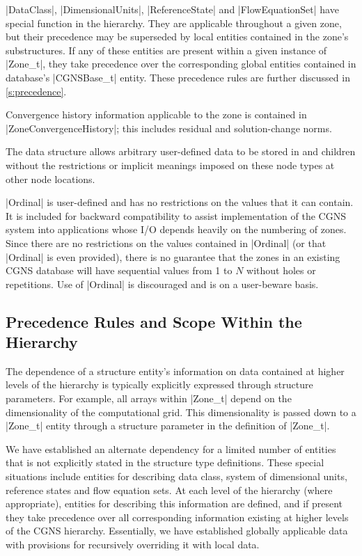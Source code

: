 |DataClass|, |DimensionalUnits|, |ReferenceState| and |FlowEquationSet| have
special function in the hierarchy.  They are applicable throughout a given
zone, but their precedence may be superseded by local entities contained in
the zone's substructures.  If any of these entities are present within a
given instance of |Zone_t|, they take precedence over the corresponding
global entities contained in database's |CGNSBase_t| entity.  These
precedence rules are further discussed in \autoref{s:precedence}.

Convergence history information applicable to the zone is contained in
|ZoneConvergenceHistory|; this includes residual and solution-change norms.

The  data structure allows arbitrary
user-defined data to be stored in  and
 children without the restrictions or implicit
meanings imposed on these node types at other node locations.

|Ordinal| is user-defined and has no restrictions on the values that
it can contain.
It is included for backward compatibility to assist implementation
of the CGNS system into  applications whose I/O depends heavily on the
numbering of zones.
Since there are no restrictions on the values contained in |Ordinal|
(or that |Ordinal| is even provided), there is no guarantee that the
zones in an existing CGNS database will have sequential values from
1 to $N$ without holes or repetitions.
Use of |Ordinal| is discouraged and is on a user-beware basis.

\subsection{Precedence Rules and Scope Within the Hierarchy}
\label{s:precedence}

The dependence of a structure entity's information on data contained at 
higher levels of the hierarchy is typically explicitly expressed through
structure parameters.  For example, all arrays within |Zone_t| depend on
the dimensionality of the computational grid.  This dimensionality is
passed down to a |Zone_t| entity through a structure parameter in the
definition of |Zone_t|.

We have established an alternate dependency for a limited number
of entities that is not explicitly stated in the structure type
definitions.  These special situations include entities for describing
data class, system of dimensional units, reference states and flow
equation sets.  At each level of the hierarchy (where appropriate),
entities for describing this information are defined, and if present
they take precedence over all corresponding information existing at
higher levels of the CGNS hierarchy.  Essentially, we have established
globally applicable data with provisions for recursively overriding it
with local data.


